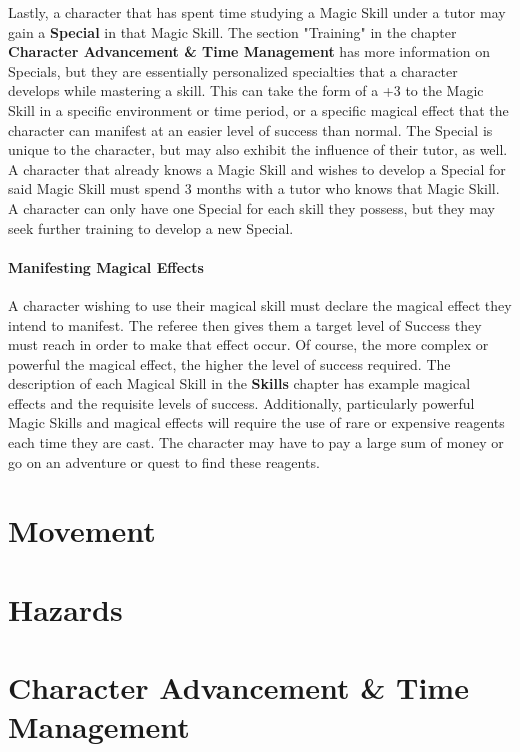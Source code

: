 \documentclass[oneside]{book}
\begin{document}
\begin{multicols}{2}
Lastly, a character that has spent time studying a Magic Skill under a tutor may gain a \textbf{Special} in that Magic Skill. The section "Training" in the chapter \textbf{Character Advancement \& Time Management} has more information on Specials, but they are essentially personalized specialties that a character develops while mastering a skill. This can take the form of a +3 to the Magic Skill in a specific environment or time period, or a specific magical effect that the character can manifest at an easier level of success than normal. The Special is unique to the character, but may also exhibit the influence of their tutor, as well. A character that already knows a Magic Skill and wishes to develop a Special for said Magic Skill must spend 3 months with a tutor who knows that Magic Skill. A character can only have one Special for each skill they possess, but they may seek further training to develop a new Special.

\subsubsection{Manifesting Magical Effects}
A character wishing to use their magical skill must declare the magical effect they intend to manifest. The referee then gives them a target level of Success they must reach in order to make that effect occur. Of course, the more complex or powerful the magical effect, the higher the level of success required. The description of each Magical Skill in the \textbf{Skills} chapter has example magical effects and the requisite levels of success. Additionally, particularly powerful Magic Skills and magical effects will require the use of rare or expensive reagents each time they are cast. The character may have to pay a large sum of money or go on an adventure or quest to find these reagents.



\end{multicols}

\chapter{Movement}

\chapter{Hazards}

\chapter{Character Advancement \& Time Management}
\end{document}
